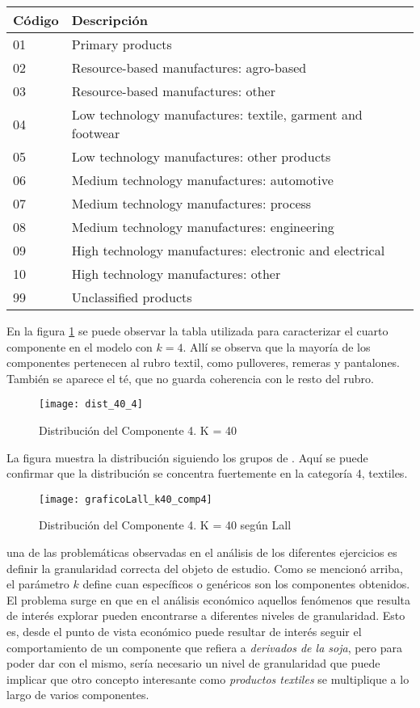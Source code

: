 \documentclass[class=article, crop=false]{standalone}
\begin{document}
\begin{table}[ht]
	\centering
	\begin{tabular}{ll}
		\hline
		 Código & Descripción \\ 
		\hline
		01 & Primary products \\ 
		02 & Resource-based manufactures: agro-based \\ 
		03 & Resource-based manufactures: other \\ 
		04 & Low technology manufactures: textile, garment and footwear \\ 
		05 & Low technology manufactures: other products \\ 
		06 & Medium technology manufactures: automotive \\ 
		07 & Medium technology manufactures: process \\ 
		08 & Medium technology manufactures: engineering \\ 
		09 & High technology manufactures: electronic and electrical \\ 
		10 & High technology manufactures: other \\ 
		99 & Unclassified products \\ 
		\hline
	\end{tabular}
\end{table}

En la figura \ref{fig:dist_40_4} se puede observar la tabla utilizada para caracterizar el cuarto componente en el modelo con $k=4$. Allí se observa que la mayoría de los componentes pertenecen al rubro textil, como pulloveres, remeras y pantalones. También se aparece el té, que no guarda coherencia con le resto del rubro.

\begin{figure}[h]
	\centering	
	\texttt{[image: dist\_40\_4]}
	\caption{Distribución del Componente 4. K = 40}
	\label{fig:dist_40_4}
\end{figure}

La figura muestra la distribución siguiendo los grupos de \cite{lall2000technological}. Aquí se puede confirmar que la distribución se concentra fuertemente en la categoría 4, textiles. 

\begin{figure}[h]
	\centering	
	\texttt{[image: graficoLall\_k40\_comp4]}
	\caption{Distribución del Componente 4. K = 40 según Lall}
	\label{fig:dist_40_4_lall}
\end{figure}

una de las problemáticas observadas en el análisis de los diferentes ejercicios es definir la granularidad correcta del objeto de estudio. Como se mencionó arriba, el parámetro $k$ define cuan específicos o genéricos son los componentes obtenidos. El problema surge en que en el análisis económico aquellos fenómenos que resulta de interés explorar pueden encontrarse a diferentes niveles de granularidad. Esto es, desde el punto de vista económico puede resultar de interés seguir el comportamiento de un componente que refiera a \textit{derivados de la soja}, pero para poder dar con el mismo, sería necesario un nivel de granularidad que puede implicar que otro concepto interesante como \textit{productos textiles} se multiplique a lo largo de varios componentes. 
\end{document}
